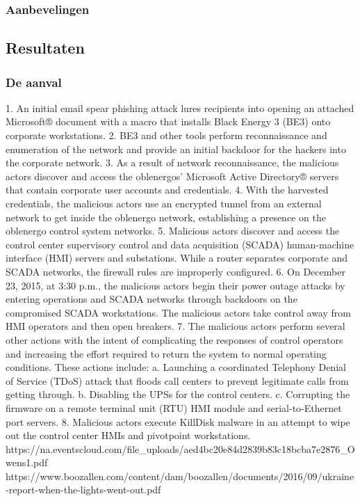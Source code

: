 \documentclass{article}
\begin{document}
	\subsubsection{Aanbevelingen}
	
	\subsection{Resultaten}
	\subsubsection{De aanval}
	1. An initial email spear phishing attack lures recipients
	into opening an attached Microsoft® document with a
	macro that installs Black Energy 3 (BE3) onto
	corporate workstations.
	2. BE3 and other tools perform reconnaissance and
	enumeration of the network and provide an initial
	backdoor for the hackers into the corporate network.
	3. As a result of network reconnaissance, the malicious
	actors discover and access the oblenergos’ Microsoft
	Active Directory® servers that contain corporate user
	accounts and credentials.
	4. With the harvested credentials, the malicious actors use
	an encrypted tunnel from an external network to get
	inside the oblenergo network, establishing a presence
	on the oblenergo control system networks.
	5. Malicious actors discover and access the control center
	supervisory control and data acquisition (SCADA)
	human-machine interface (HMI) servers and
	substations. While a router separates corporate and
	SCADA networks, the firewall rules are improperly
	configured.
	6. On December 23, 2015, at 3:30 p.m., the malicious
	actors begin their power outage attacks by entering
	operations and SCADA networks through backdoors on
	the compromised SCADA workstations. The malicious
	actors take control away from HMI operators and then
	open breakers.
	7. The malicious actors perform several other actions with
	the intent of complicating the responses of control
	operators and increasing the effort required to return the
	system to normal operating conditions. These actions
	include:
	a. Launching a coordinated Telephony Denial of
	Service (TDoS) attack that floods call centers to
	prevent legitimate calls from getting through.
	b. Disabling the UPSs for the control centers.
	c. Corrupting the firmware on a remote terminal unit
	(RTU) HMI module and serial-to-Ethernet port
	servers.
	8. Malicious actors execute KillDisk malware in an
	attempt to wipe out the control center HMIs and pivotpoint workstations.
	https://na.eventscloud.com/file_uploads/aed4bc20e84d2839b83c18bcba7e2876_Owens1.pdf
	https://www.boozallen.com/content/dam/boozallen/documents/2016/09/ukraine-report-when-the-lights-went-out.pdf
\end{document}
